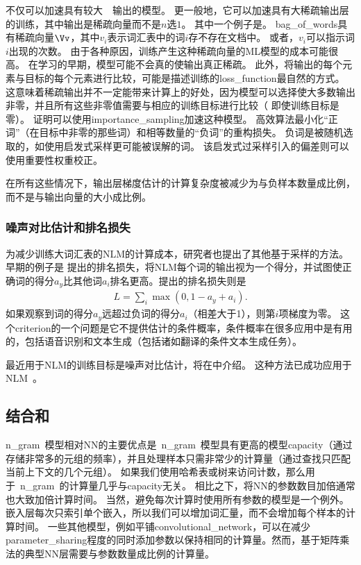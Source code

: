 不仅可以加速具有较大~~输出的模型。
更一般地，它可以加速具有大稀疏输出层的训练，其中输出是稀疏向量而不是$n$选$1$。
其中一个例子是。
\gls{bag_of_words}具有稀疏向量$\Vv$，其中$v_i$表示词汇表中的词$i$存不存在文档中。
或者，$v_i$可以指示词$i$出现的次数。
由于各种原因，训练产生这种稀疏向量的\gls{ML}模型的成本可能很高。
在学习的早期，模型可能不会真的使输出真正稀疏。
此外，将输出的每个元素与目标的每个元素进行比较，可能是描述训练的\gls{loss_function}最自然的方式。
这意味着稀疏输出并不一定能带来计算上的好处，因为模型可以选择使大多数输出非零，并且所有这些非零值需要与相应的训练目标进行比较（ 即使训练目标是零）。
\citet{Dauphin2011-small} 证明可以使用\gls{importance_sampling}加速这种模型。
高效算法最小化``正词''（在目标中非零的那些词）和相等数量的``负词''的重构损失。
负词是被随机选取的，如使用启发式采样更可能被误解的词。
该启发式过采样引入的偏差则可以使用重要性权重校正。


在所有这些情况下，输出层梯度估计的计算复杂度被减少为与负样本数量成比例，而不是与输出向量的大小成比例。


\subsubsection{噪声对比估计和排名损失}


\label{sec:combining_neural_language_models_with_n_grams}
为减少训练大词汇表的\gls{NLM}的计算成本，研究者也提出了其他基于采样的方法。
早期的例子是 \citet{Collobert+Weston-ICML2008}提出的排名损失，将\gls{NLM}每个词的输出视为一个得分，并试图使正确词的得分$a_y$比其他词$a_i$排名更高。提出的排名损失则是
\begin{align} 
 L = \sum_i \max(0,1-a_y+a_i).
\end{align} 
如果观察到词的得分$a_y$远超过负词的得分$a_i$（相差大于1），则第$i$项梯度为零。
这个\gls{criterion}的一个问题是它不提供估计的条件概率，条件概率在很多应用中是有用的，包括语音识别和文本生成（包括诸如翻译的条件文本生成任务）。

最近用于\gls{NLM}的训练目标是噪声对比估计，将在中介绍。
这种方法已成功应用于\gls{NLM}~\citep{Mnih+Teh-ICML2012,Mnih2013}。


\subsection{结合和}
\gls{n_gram}~模型相对\gls{NN}的主要优点是~\gls{n_gram}~模型具有更高的模型\gls{capacity}（通过存储非常多的元组的频率），并且处理样本只需非常少的计算量（通过查找只匹配当前上下文的几个元组）。
如果我们使用哈希表或树来访问计数，那么用于~\gls{n_gram}~的计算量几乎与\gls{capacity}无关。
相比之下，将\gls{NN}的参数数目加倍通常也大致加倍计算时间。
当然，避免每次计算时使用所有参数的模型是一个例外。
嵌入层每次只索引单个嵌入，所以我们可以增加词汇量，而不会增加每个样本的计算时间。
一些其他模型，例如平铺\gls{convolutional_network}，可以在减少\gls{parameter_sharing}程度的同时添加参数以保持相同的计算量。然而，基于矩阵乘法的典型\gls{NN}层需要与参数数量成比例的计算量。

